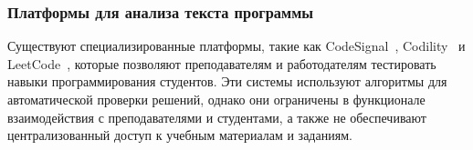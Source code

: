 \subsubsection{Платформы для анализа текста программы}
Существуют специализированные платформы, такие как CodeSignal~\cite{codesignal_wiki}, Codility~\cite{codility_wiki} и LeetCode~\cite{leetcode_wiki}, которые позволяют преподавателям и работодателям тестировать навыки программирования студентов. Эти системы используют алгоритмы для автоматической проверки решений, однако они ограничены в функционале взаимодействия с преподавателями и студентами, а также не обеспечивают централизованный доступ к учебным материалам и заданиям.
